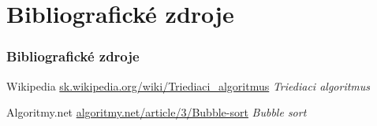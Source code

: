 \documentclass{beamer}
\begin{document}
	\section{Bibliografické zdroje}
	\begin{frame}
		\frametitle{Bibliografické zdroje}
		\begin{thebibliography}{10}
			Wikipedia
			\newblock \url{sk.wikipedia.org/wiki/Triediaci_algoritmus}
			\newblock \emph{Triediaci algoritmus}

			Algoritmy.net
				\newblock \url{algoritmy.net/article/3/Bubble-sort}
			\newblock \emph{Bubble sort}
		\end{thebibliography}
	\end{frame}
	
\end{document}
